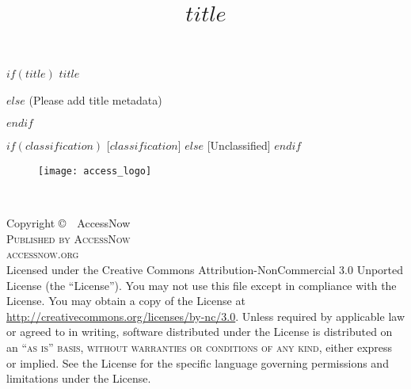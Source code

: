 \documentclass[11pt,fleqn]{book} %
\title{$title$}
\begin{document}

\begingroup
\thispagestyle{empty}
\centering
\vspace*{9cm}
\par\normalfont\fontsize{35}{35}\sffamily\selectfont
$if(title)$
$title$\par %
$else$
(Please add title metadata)\par %
$endif$

\par\normalfont\fontsize{22}{22}\sffamily\selectfont
$if(classification)$
[$classification$]
$else$
[Unclassified]
$endif$

\vspace*{1cm}

\begin{figure}[h]
  \centering
    \texttt{[image: access\_logo]}
\end{figure}

\endgroup


\newpage
~\vfill
\thispagestyle{empty}

\noindent Copyright \copyright\ \the\year \ AccessNow\\ %

\noindent \textsc{Published by AccessNow}\\ %

\noindent \textsc{accessnow.org}\\ %

\noindent Licensed under the Creative Commons Attribution-NonCommercial 3.0 Unported License (the ``License''). You may not use this file except in compliance with the License. You may obtain a copy of the License at \url{http://creativecommons.org/licenses/by-nc/3.0}. Unless required by applicable law or agreed to in writing, software distributed under the License is distributed on an \textsc{``as is'' basis, without warranties or conditions of any kind}, either express or implied. See the License for the specific language governing permissions and limitations under the License.\\ %
\end{document}
